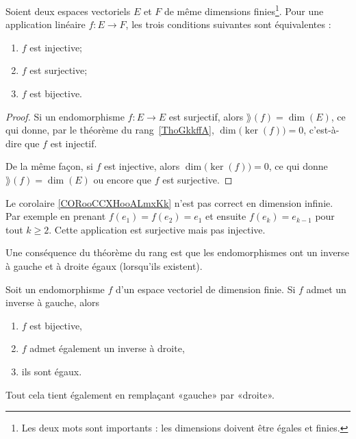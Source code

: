 \begin{corollary}       \label{CORooCCXHooALmxKk}
    Soient deux espaces vectoriels \( E\) et \( F\) de même dimensions finies\footnote{Les deux mots sont importants : les dimensions doivent être égales et finies.}. Pour une application linéaire \( f\colon E\to F\), les trois conditions suivantes sont équivalentes :
    \begin{enumerate}
        \item
            \( f\) est injective;
        \item
            \( f\) est surjective;
        \item
            \( f\) est bijective.
    \end{enumerate}
\end{corollary}

\begin{proof}
    Si un endomorphisme \( f\colon E\to E\) est surjectif, alors \( \rang(f)=\dim(E)\), ce qui donne, par le théorème du rang~\ref{ThoGkkffA}, \( \dim\big( \ker(f) \big)=0\), c'est-à-dire que \( f\) est injectif.

    De la même façon, si \( f\) est injective, alors \( \dim\big( \ker(f) \big)=0\), ce qui donne \( \rang(f)=\dim(E)\) ou encore que \( f\) est surjective.
\end{proof}

\begin{example}
    Le corolaire \ref{CORooCCXHooALmxKk} n'est pas correct en dimension infinie. Par exemple en prenant \( f(e_1)=f(e_2)=e_1\) et ensuite \( f(e_k)=e_{k-1}\) pour tout \( k\geq 2\). Cette application est surjective mais pas injective.
\end{example}

Une conséquence du théorème du rang est que les endomorphismes ont un inverse à gauche et à droite égaux (lorsqu'ils existent).
\begin{corollary}
    Soit un endomorphisme \( f\) d'un espace vectoriel de dimension finie. Si \( f\) admet un inverse à gauche, alors
    \begin{enumerate}
        \item
            \( f\) est bijective,
        \item
            \( f\) admet également un inverse à droite,
        \item
            ils sont égaux.
    \end{enumerate}
    Tout cela tient également en remplaçant «gauche» par «droite».
\end{corollary}

